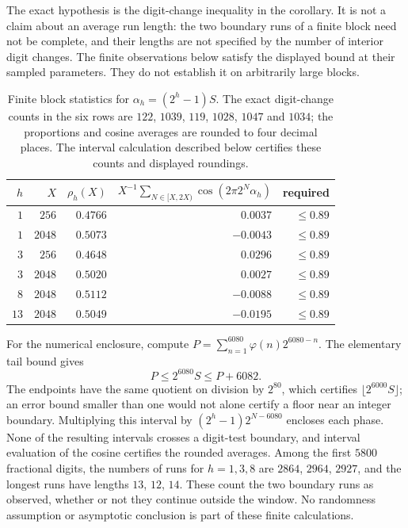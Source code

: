 \documentclass[11pt]{article}
\theoremstyle{plain}
\theoremstyle{definition}
\theoremstyle{remark}
\begin{document}
\noindent
The exact hypothesis is the digit-change inequality in the
corollary. It is not a claim about an average run length: the two boundary
runs of a finite block need not be complete, and their lengths are not
specified by the number of interior digit changes.
The finite observations below satisfy the displayed bound at their sampled
parameters. They do not establish it on arbitrarily large blocks.


\begin{table}[h]\centering
\begin{tabular}{r r r r r}
\hline
$h$ & $X$ & $\rho_h(X)$ & $X^{-1}\sum_{N\in[X,2X)}\cos(2\pi 2^N\alpha_h)$ & required \\
\hline
$1$ & $256$  & $0.4766$ & $\phantom{-}0.0037$ & $\le 0.89$ \\
$1$ & $2048$ & $0.5073$ & $-0.0043$ & $\le 0.89$ \\
$3$ & $256$  & $0.4648$ & $\phantom{-}0.0296$ & $\le 0.89$ \\
$3$ & $2048$ & $0.5020$ & $\phantom{-}0.0027$ & $\le 0.89$ \\
$8$ & $2048$ & $0.5112$ & $-0.0088$ & $\le 0.89$ \\
$13$& $2048$ & $0.5049$ & $-0.0195$ & $\le 0.89$ \\
\hline
\end{tabular}
\caption{Finite block statistics for $\alpha_h=(2^h-1)S$.
The exact digit-change counts in the six rows are $122$, $1039$, $119$,
$1028$, $1047$ and $1034$; the proportions and cosine averages are
rounded to four decimal places. The interval calculation described
below certifies these counts and displayed roundings.}
\label{tab:blocks}
\end{table}

For the numerical enclosure, compute
$P=\sum_{n=1}^{6080}\varphi(n)2^{6080-n}$. The elementary tail bound gives
\[
 P\le2^{6080}S\le P+6082.
\]
The endpoints have the same quotient on division by $2^{80}$, which
certifies $\lfloor2^{6000}S\rfloor$; an error bound smaller than one
would not alone certify a floor near an integer boundary.
Multiplying this interval by $(2^h-1)2^{N-6080}$ encloses each phase.
None of the resulting intervals crosses a digit-test boundary, and
interval evaluation of the cosine certifies the rounded averages.
Among the first $5800$ fractional digits, the numbers of runs for
$h=1,3,8$ are $2864$, $2964$, $2927$, and the longest runs have lengths
$13$, $12$, $14$. These count the two boundary runs as observed, whether
or not they continue outside the window. No randomness assumption or
asymptotic conclusion is part of these finite calculations.
\end{document}
